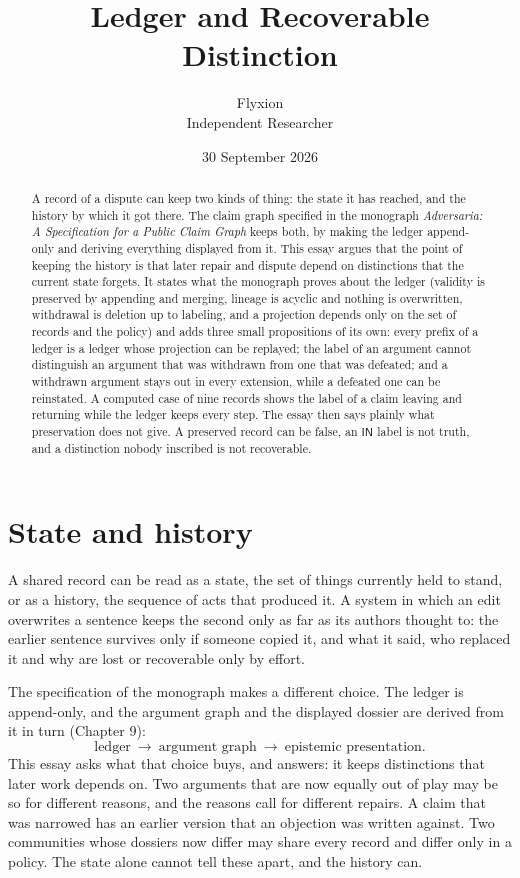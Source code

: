 \documentclass[11pt]{article}
\title{Ledger and Recoverable Distinction}
\author{Flyxion\\\small Independent Researcher}
\date{30 September 2026}
\theoremstyle{plain}
\theoremstyle{definition}
\theoremstyle{remark}
\newcommand{\IN}{\textsf{IN}}
\begin{document}
\maketitle

\begin{abstract}
\noindent
A record of a dispute can keep two kinds of thing: the state it has reached, and the history by which it got there. The claim graph specified in the monograph \emph{Adversaria: A Specification for a Public Claim Graph} keeps both, by making the ledger append-only and deriving everything displayed from it. This essay argues that the point of keeping the history is that later repair and dispute depend on distinctions that the current state forgets. It states what the monograph proves about the ledger (validity is preserved by appending and merging, lineage is acyclic and nothing is overwritten, withdrawal is deletion up to labeling, and a projection depends only on the set of records and the policy) and adds three small propositions of its own: every prefix of a ledger is a ledger whose projection can be replayed; the label of an argument cannot distinguish an argument that was withdrawn from one that was defeated; and a withdrawn argument stays out in every extension, while a defeated one can be reinstated. A computed case of nine records shows the label of a claim leaving and returning while the ledger keeps every step. The essay then says plainly what preservation does not give. A preserved record can be false, an $\IN$ label is not truth, and a distinction nobody inscribed is not recoverable.
\end{abstract}

\section{State and history}\label{sec:intro}

A shared record can be read as a state, the set of things currently held to stand, or as a history, the sequence of acts that produced it. A system in which an edit overwrites a sentence keeps the second only as far as its authors thought to: the earlier sentence survives only if someone copied it, and what it said, who replaced it and why are lost or recoverable only by effort.

The specification of the monograph makes a different choice. The ledger is append-only, and the argument graph and the displayed dossier are derived from it in turn (Chapter 9):
\[
\text{ledger}\ \longrightarrow\ \text{argument graph}\ \longrightarrow\ \text{epistemic presentation}.
\]
This essay asks what that choice buys, and answers: it keeps distinctions that later work depends on. Two arguments that are now equally out of play may be so for different reasons, and the reasons call for different repairs. A claim that was narrowed has an earlier version that an objection was written against. Two communities whose dossiers now differ may share every record and differ only in a policy. The state alone cannot tell these apart, and the history can.
\end{document}

